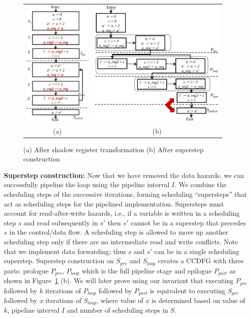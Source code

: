\begin{figure}[t!]
\begin{center}
\begin{tabular}{cc}
\includegraphics[height=2.5in]{fig-proposal/algorithm-after-shadow-register}
&
\includegraphics[height=2.5in]{fig-proposal/algorithm-after-superstep-construction}
\\
(a) & (b)
\end{tabular}
\end{center}
\caption{(a) After shadow register transformation (b) After superstep construction}
\label{fig:algo3}
\end{figure}

{\bf Superstep construction:} Now that we have removed the data hazards, we can successfully pipeline the loop using  the pipeline interval $I$. We combine the scheduling steps of the successive iterations, forming scheduling ``supersteps'' that act as scheduling steps for the pipelined
implementation. Supersteps must account for read-after-write hazards, i.e., if a variable is written in a scheduling step $s$ and read subsequently in $s'$ then $s'$ cannot be in a superstep that precedes $s$ in the control/data flow. A scheduling step is allowed to move up another scheduling step only if there are no intermediate read and write conflicts. Note that we implement data forwarding; thus $s$ and $s'$ can be in a single scheduling superstep.
Superstep construction on $S_{pre}$ and $S_{loop}$ creates a CCDFG with three parts: prologue $P_{pre}$, $P_{loop}$ which is the full pipeline stage and epilogue $P_{post}$ as shown in Figure~\ref{fig:algo3} (b). We will later prove using our invariant that executing $P_{pre}$ followed by $k$ iterations of $P_{loop}$ followed by $P_{post}$ is equivalent to executing $S_{pre}$ followed by $x$ iterations of $S_{loop}$, where value of $x$ is determined based on value of $k$, pipeline interval $I$ and number of scheduling steps in $S$.

